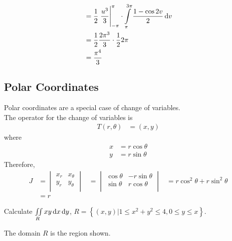 \documentclass[fleqn, a4paper, 12pt, twoside]{article}
\theoremstyle{definition}
\theoremstyle{theorem}
\begin{document}
{\begin{solution}
\begin{align*}
                                                                                   & = \frac{1}{2} \left. \frac{u^3}{3} \right|_{-\pi}^{\pi} \cdot \int\limits_{\pi}^{3 \pi} \frac{1 - \cos 2 v}{2} \dif v \\
                                                                                   & = \frac{1}{2} \frac{2 \pi^3}{3} \cdot \frac{1}{2} 2 \pi                                                               \\
                                                                                   & = \frac{\pi^4}{3}
	\end{align*}
\end{solution}

\subsection{Polar Coordinates}

Polar coordinates are a special case of change of variables.\\
The operator for the change of variables is
\begin{align*}
	T(r,\theta) & = (x,y)
\end{align*}
where
\begin{align*}
	x & = r \cos \theta \\
	y & = r \sin \theta
\end{align*}
Therefore,
\begin{align*}
	J &=
		\begin{vmatrix}
			x_r & x_{\theta} \\
			y_r & y_{\theta} \\
		\end{vmatrix}
	  &=
		\begin{vmatrix}
			\cos \theta & -r \sin \theta \\
			\sin \theta & r \cos \theta  \\
		\end{vmatrix}
	  &= r \cos^2 \theta + r \sin^2 \theta\\
	  &= r
\end{align*}

\begin{question}
	Calculate $\iint\limits_{R} x y \dif x \dif y$, $R = \left\{ (x,y) | 1 \le x^2 + y^2 \le 4 , 0 \le y \le x \right\}$.
\end{question}

\begin{solution}
	The domain $R$ is the region shown.
	\begin{figure}[H]
\end{figure}
\end{solution}}
\end{document}
